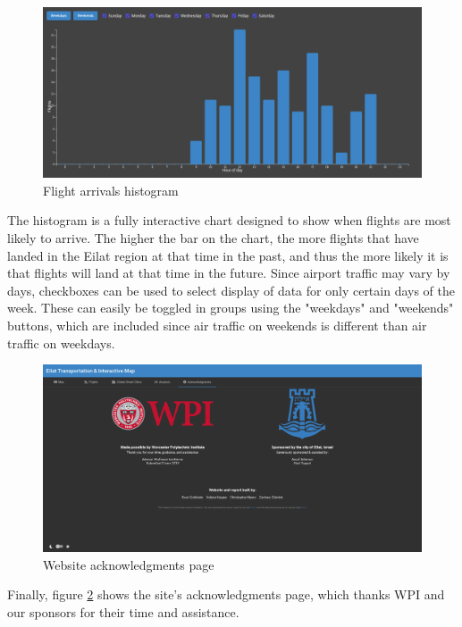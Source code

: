 \documentclass[12pt]{article}                               %
\begin{document}
\newpage
\begin{figure}[H]
    \centering
    \includegraphics[width=1\columnwidth]{images/site_flights_graph.png}
    \caption{Flight arrivals histogram}
    \label{img:site_flights_histogram}
\end{figure}

The histogram is a fully interactive chart designed to show when flights are most likely to arrive. The higher the bar on the chart, the more flights that have landed in the Eilat region at that time in the past, and thus the more likely it is that flights will land at that time in the future. Since airport traffic may vary by days, checkboxes can be used to select display of data for only certain days of the week. These can easily be toggled in groups using the "weekdays" and "weekends" buttons, which are included since air traffic on weekends is different than air traffic on weekdays.

\begin{figure}[H]
    \centering
    \includegraphics[width=1\linewidth]{images/site_about.png}
    \caption{Website acknowledgments page}
    \label{img:site_about}
\end{figure}

Finally, figure \ref{img:site_about} shows the site's acknowledgments page, which thanks WPI and our sponsors for their time and assistance.
\end{document}
